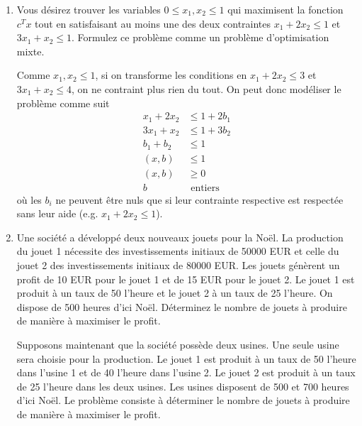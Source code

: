 \begin{enumerate}
  \item Vous désirez trouver les variables $0 \leq x_1, x_2 \leq 1$ qui maximisent la fonction $c^T x$ tout en satisfaisant au
    moins une  des deux contraintes $x_1 + 2 x_2 \leq 1$  et  $3 x_1 +  x_2 \leq 1$. Formulez ce problème comme un
    problème d'optimisation mixte.

    \begin{solution}
      Comme $x_1,x_2 \leq 1$, si on transforme les conditions en
      $x_1 + 2x_2 \leq 3$ et $3x_1 + x_2 \leq 4$,
      on ne contraint plus rien du tout.
      On peut donc modéliser le problème comme suit
      \begin{align*}
        x_1 + 2x_2 & \leq 1 + 2b_1\\
        3x_1 + x_2 & \leq 1 + 3b_2\\
        b_1 + b_2 & \leq 1\\
        (x,b) & \leq 1\\
        (x,b) & \geq 0\\
        b & \text{ entiers}
      \end{align*}
      où les $b_i$ ne peuvent être nuls que si leur contrainte respective
      est respectée sans leur aide (e.g. $x_1 + 2x_2 \leq 1$).
    \end{solution}

  \item Une société a développé deux nouveaux jouets pour la Noël. La production du jouet 1 nécessite des investissements initiaux de
    50000 EUR et celle du jouet 2 des investissements initiaux de 80000 EUR. Les jouets
    génèrent un profit de 10 EUR pour le jouet 1 et de 15 EUR pour le jouet 2.  Le jouet 1 est
    produit à un taux de 50 l'heure et le jouet 2 à un taux de 25 l'heure. On dispose  de 500 heures
    d'ici Noël. Déterminez le nombre de jouets à produire de manière à maximiser le profit.


    Supposons maintenant que la société possède deux usines. Une seule usine sera choisie pour la production. Le
    jouet 1 est produit à un taux de 50 l'heure dans l'usine 1 et de 40 l'heure dans l'usine 2. Le jouet 2 est produit à un taux de
    25 l'heure dans les deux usines. Les usines disposent de 500 et 700 heures d'ici Noël.  Le problème consiste à déterminer le
    nombre de jouets à produire de manière à maximiser le profit.













\end{enumerate}

